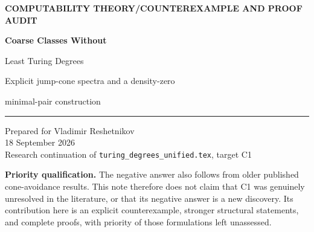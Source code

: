 \documentclass[11pt,a4paper]{article}
\newcommand{\leT}{\leq_{\mathrm T}}
\newcommand{\nleT}{\nleq_{\mathrm T}}
\newcommand{\degT}{\operatorname{deg}_{\mathrm T}}
\newcommand{\R}{\mathcal R}
\newcommand{\zero}{\mathbf 0}
\theoremstyle{definition}\newtheorem{definition}[theorem]{Definition}
\theoremstyle{remark}\newtheorem{remark}[theorem]{Remark}
\begin{document}
\begin{titlepage}
\vspace*{12mm}
{\small\sffamily\bfseries\color{navy}COMPUTABILITY THEORY\quad /\quad COUNTEREXAMPLE AND PROOF AUDIT\par}
\vspace{15mm}
{\Huge\bfseries\color{navy}Coarse Classes Without\par Least Turing Degrees\par}
\vspace{8mm}
{\Large Explicit jump-cone spectra and a density-zero\par minimal-pair construction\par}
\vspace{14mm}
\noindent\rule{\textwidth}{0.5pt}
\vspace{5mm}
\noindent Prepared for Vladimir Reshetnikov\\[3pt]
18 September 2026\\
Research continuation of \texttt{turing\_degrees\_unified.tex}, target C1
\vspace{9mm}
\begin{abstract}
We give a negative answer to the least-representative statement designated C1 in the supplied report. An explicit counterexample is the characteristic function
\[
 X(n)=\chi_{\emptyset''}\bigl(\nu_2(n+1)\bigr).
\]
Its uniform and nonuniform coarse-equivalence classes have exactly the Turing degrees $\mathbf b$ satisfying $\mathbf b'\geq\zero''$ as their representative spectra. More generally, the column coding $\R(A)$ has spectrum $\{\degT(B):A\leT B'\}$. A fully described product finite-extension construction produces two coarse descriptions of $\R(A)$ with no noncomputable common lower bound and with both jumps equivalent to $A\oplus\emptyset'$. This proves nonexistence of a least representative whenever $A\nleT\emptyset'$. We also classify reductions between these column codes, obtain a countable pairwise minimal-pair family, and calculate the contrasting effective-dense spectra. The proofs do not assume an unproved minimal-pair theorem. Finite Python checks accompany the argument; they are not a formal verification of its infinite assertions.
\end{abstract}
\vfill
\noindent\small\textbf{Priority qualification.} The negative answer also follows from older published cone-avoidance results. This note therefore does not claim that C1 was genuinely unresolved in the literature, or that its negative answer is a new discovery. Its contribution here is an explicit counterexample, stronger structural statements, and complete proofs, with priority of those formulations left unassessed.
\end{titlepage}
{\small\tableofcontents}
\newpage
\end{document}
